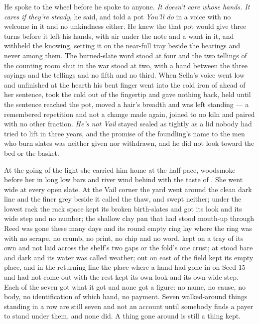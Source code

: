 He spoke to the wheel before he spoke to anyone. \emph{It doesn't care whose hands. It cares if they're steady}, he said, and told a pot \emph{You'll do} in a voice with no welcome in it and no unkindness either. He knew the  that pot would give three turns before it left his hands, with air under the note and a want in it, and withheld the knowing, setting it on the near-full tray beside the hearings and never among them. The burned-slate word stood at four and the two tellings of the counting room shut in the war stood at two, with a hand between the three sayings and the tellings and no fifth and no third. When Sella's voice went low and unfinished at the hearth his bent finger went into the cold iron of  ahead of her sentence, took the cold out of the fingertip and gave nothing back, held until the sentence reached the pot, moved a hair's breadth and was left standing --- a remembered repetition and not a change made again, joined to no kiln and paired with no other fraction. \emph{He's not Vail} stayed sealed as tightly as a lid nobody had tried to lift in three years, and the promise of the foundling's name to the men who burn slates was neither given nor withdrawn, and he did not look toward the bed or the basket.

\scenebreak

At the going of the light she carried him home at the half-pace, woodsmoke before her in long low bars and river wind behind with the taste of . She went wide at every open slate. At the Vail corner the yard went around the clean dark line and the finer grey beside it called the thaw, and swept neither; under the lowest rack the rack space kept its broken birth-slates and got its look and its wide step and no number; the shallow clay pan that had stood mouth-up through Reed was gone these many days and its round empty ring lay where the ring was with no scrape, no crumb, no print, no chip and no word, kept on a tray of its own and not laid across the shelf's two gaps or the fold's one crust; at   stood bare and dark and its water was called weather; out on  east of  the field kept its empty place, and in the returning line the place where a hand had gone in on Seed 15 and had not come out with the rest kept its own look and its own wide step. Each of the seven got what it got and none got a figure: no name, no cause, no body, no identification of which hand, no payment. Seven walked-around things standing in a row are still seven and not an account until somebody finds a payer to stand under them, and none did. A thing gone around is still a thing kept.

